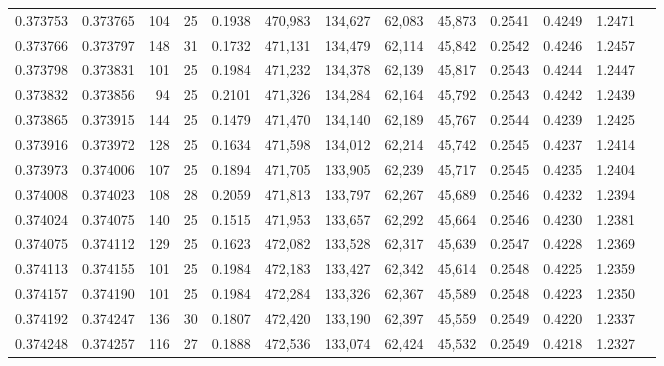 \begin{tabular}{rrrrrrrrrrrrr}
0.373753 & 0.373765 &   104 &  25 &                                     0.1938 & 470,983 & 134,627 &  62,083 &  45,873 & 0.2541 & 0.4249 & 1.2471 \\
0.373766 & 0.373797 &   148 &  31 &                                     0.1732 & 471,131 & 134,479 &  62,114 &  45,842 & 0.2542 & 0.4246 & 1.2457 \\
0.373798 & 0.373831 &   101 &  25 &                                     0.1984 & 471,232 & 134,378 &  62,139 &  45,817 & 0.2543 & 0.4244 & 1.2447 \\
0.373832 & 0.373856 &    94 &  25 &                                     0.2101 & 471,326 & 134,284 &  62,164 &  45,792 & 0.2543 & 0.4242 & 1.2439 \\
0.373865 & 0.373915 &   144 &  25 &                                     0.1479 & 471,470 & 134,140 &  62,189 &  45,767 & 0.2544 & 0.4239 & 1.2425 \\
0.373916 & 0.373972 &   128 &  25 &                                     0.1634 & 471,598 & 134,012 &  62,214 &  45,742 & 0.2545 & 0.4237 & 1.2414 \\
0.373973 & 0.374006 &   107 &  25 &                                     0.1894 & 471,705 & 133,905 &  62,239 &  45,717 & 0.2545 & 0.4235 & 1.2404 \\
0.374008 & 0.374023 &   108 &  28 &                                     0.2059 & 471,813 & 133,797 &  62,267 &  45,689 & 0.2546 & 0.4232 & 1.2394 \\
0.374024 & 0.374075 &   140 &  25 &                                     0.1515 & 471,953 & 133,657 &  62,292 &  45,664 & 0.2546 & 0.4230 & 1.2381 \\
0.374075 & 0.374112 &   129 &  25 &                                     0.1623 & 472,082 & 133,528 &  62,317 &  45,639 & 0.2547 & 0.4228 & 1.2369 \\
0.374113 & 0.374155 &   101 &  25 &                                     0.1984 & 472,183 & 133,427 &  62,342 &  45,614 & 0.2548 & 0.4225 & 1.2359 \\
0.374157 & 0.374190 &   101 &  25 &                                     0.1984 & 472,284 & 133,326 &  62,367 &  45,589 & 0.2548 & 0.4223 & 1.2350 \\
0.374192 & 0.374247 &   136 &  30 &                                     0.1807 & 472,420 & 133,190 &  62,397 &  45,559 & 0.2549 & 0.4220 & 1.2337 \\
0.374248 & 0.374257 &   116 &  27 &                                     0.1888 & 472,536 & 133,074 &  62,424 &  45,532 & 0.2549 & 0.4218 & 1.2327 \\

\end{tabular}

